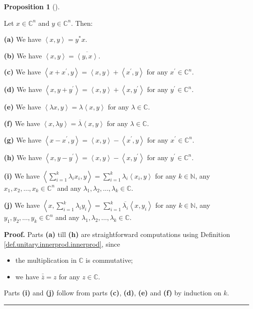 \documentclass[numbers=enddot,12pt,final,onecolumn,notitlepage]{scrartcl}%
\numberwithin{exer}{subsection}
\theoremstyle{definition}
\newtheorem{prop}[theo]{Proposition}
\newenvironment{proposition}[1][]
{\begin{prop}[#1]\begin{leftbar}}
{\end{leftbar}\end{prop}}
\newenvironment{proof}[1][Proof]{\noindent\textbf{#1.} }{\ \rule{0.5em}{0.5em}}
\let\sumnonlimits\sum
\renewcommand{\sum}{\sumnonlimits\limits}
\begin{document}
\begin{proposition}
\label{prop.unitary.innerprod.props}Let $x\in\mathbb{C}^{n}$ and
$y\in\mathbb{C}^{n}$. Then:

\textbf{(a)} We have $\left\langle x,y\right\rangle =y^{\ast}x$.

\textbf{(b)} We have $\left\langle x,y\right\rangle =\overline{\left\langle
y,x\right\rangle }$.

\textbf{(c)} We have $\left\langle x+x^{\prime},y\right\rangle =\left\langle
x,y\right\rangle +\left\langle x^{\prime},y\right\rangle $ for any $x^{\prime
}\in\mathbb{C}^{n}$.

\textbf{(d)} We have $\left\langle x,y+y^{\prime}\right\rangle =\left\langle
x,y\right\rangle +\left\langle x,y^{\prime}\right\rangle $ for any $y^{\prime
}\in\mathbb{C}^{n}$.

\textbf{(e)} We have $\left\langle \lambda x,y\right\rangle =\lambda
\left\langle x,y\right\rangle $ for any $\lambda\in\mathbb{C}$.

\textbf{(f)} We have $\left\langle x,\lambda y\right\rangle =\overline
{\lambda}\left\langle x,y\right\rangle $ for any $\lambda\in\mathbb{C}$.

\textbf{(g)} We have $\left\langle x-x^{\prime},y\right\rangle =\left\langle
x,y\right\rangle -\left\langle x^{\prime},y\right\rangle $ for any $x^{\prime
}\in\mathbb{C}^{n}$.

\textbf{(h)} We have $\left\langle x,y-y^{\prime}\right\rangle =\left\langle
x,y\right\rangle -\left\langle x,y^{\prime}\right\rangle $ for any $y^{\prime
}\in\mathbb{C}^{n}$.

\textbf{(i)} We have $\left\langle \sum_{i=1}^{k}\lambda_{i}x_{i}%
,y\right\rangle =\sum_{i=1}^{k}\lambda_{i}\left\langle x_{i},y\right\rangle $
for any $k\in\mathbb{N}$, any $x_{1},x_{2},\ldots,x_{k}\in\mathbb{C}^{n}$ and
any $\lambda_{1},\lambda_{2},\ldots,\lambda_{k}\in\mathbb{C}$.

\textbf{(j)} We have $\left\langle x,\sum_{i=1}^{k}\lambda_{i}y_{i}%
\right\rangle =\sum_{i=1}^{k}\overline{\lambda_{i}}\left\langle x,y_{i}%
\right\rangle $ for any $k\in\mathbb{N}$, any $y_{1},y_{2},\ldots,y_{k}%
\in\mathbb{C}^{n}$ and any $\lambda_{1},\lambda_{2},\ldots,\lambda_{k}%
\in\mathbb{C}$.
\end{proposition}

\begin{proof}
Parts \textbf{(a)} till \textbf{(h)} are straightforward computations using
Definition \ref{def.unitary.innerprod.innerprod}, since

\begin{itemize}
\item the multiplication in $\mathbb{C}$ is commutative;

\item we have $\overline{\overline{z}}=z$ for any $z\in\mathbb{C}$.
\end{itemize}

Parts \textbf{(i)} and \textbf{(j)} follow from parts \textbf{(c)},
\textbf{(d)}, \textbf{(e)} and \textbf{(f)} by induction on $k$.
\end{proof}
\end{document}
